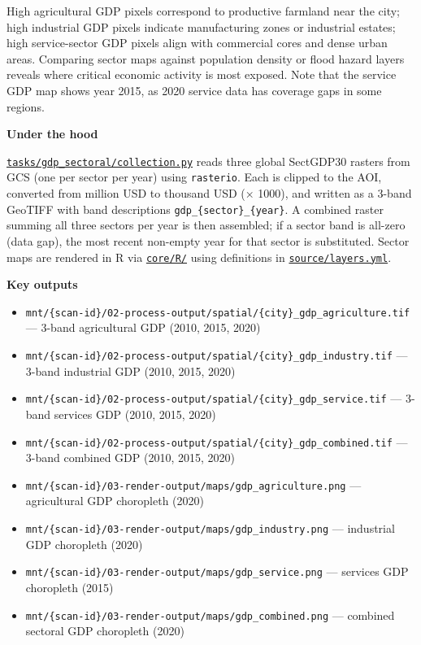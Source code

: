\documentclass[
  letterpaper,
  DIV=11,
  numbers=noendperiod]{scrreprt}
\providecommand{\tightlist}{%
  \setlength{\itemsep}{0pt}\setlength{\parskip}{0pt}}
\begin{document}
High agricultural GDP pixels correspond to productive farmland near the
city; high industrial GDP pixels indicate manufacturing zones or
industrial estates; high service-sector GDP pixels align with commercial
cores and dense urban areas. Comparing sector maps against population
density or flood hazard layers reveals where critical economic activity
is most exposed. Note that the service GDP map shows year 2015, as 2020
service data has coverage gaps in some regions.

\textbf{Under the hood}

\href{../tasks/gdp_sectoral/collection.py}{\texttt{tasks/gdp\_sectoral/collection.py}}
reads three global SectGDP30 rasters from GCS (one per sector per year)
using \texttt{rasterio}. Each is clipped to the AOI, converted from
million USD to thousand USD (× 1000), and written as a 3-band GeoTIFF
with band descriptions \texttt{gdp\_\{sector\}\_\{year\}}. A combined
raster summing all three sectors per year is then assembled; if a sector
band is all-zero (data gap), the most recent non-empty year for that
sector is substituted. Sector maps are rendered in R via
\href{../core/R/}{\texttt{core/R/}} using definitions in
\href{../source/layers.yml}{\texttt{source/layers.yml}}.

\textbf{Key outputs}

\begin{itemize}
\tightlist
\item
  \texttt{mnt/\{scan-id\}/02-process-output/spatial/\{city\}\_gdp\_agriculture.tif}
  --- 3-band agricultural GDP (2010, 2015, 2020)
\item
  \texttt{mnt/\{scan-id\}/02-process-output/spatial/\{city\}\_gdp\_industry.tif}
  --- 3-band industrial GDP (2010, 2015, 2020)
\item
  \texttt{mnt/\{scan-id\}/02-process-output/spatial/\{city\}\_gdp\_service.tif}
  --- 3-band services GDP (2010, 2015, 2020)
\item
  \texttt{mnt/\{scan-id\}/02-process-output/spatial/\{city\}\_gdp\_combined.tif}
  --- 3-band combined GDP (2010, 2015, 2020)
\item
  \texttt{mnt/\{scan-id\}/03-render-output/maps/gdp\_agriculture.png}
  --- agricultural GDP choropleth (2020)
\item
  \texttt{mnt/\{scan-id\}/03-render-output/maps/gdp\_industry.png} ---
  industrial GDP choropleth (2020)
\item
  \texttt{mnt/\{scan-id\}/03-render-output/maps/gdp\_service.png} ---
  services GDP choropleth (2015)
\item
  \texttt{mnt/\{scan-id\}/03-render-output/maps/gdp\_combined.png} ---
  combined sectoral GDP choropleth (2020)
\end{itemize}
\end{document}
